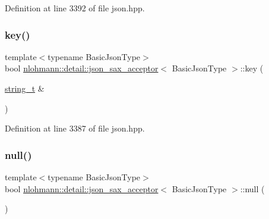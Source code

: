 Definition at line 3392 of file json.\+hpp.

\mbox{\label{classnlohmann_1_1detail_1_1json__sax__acceptor_a59e1ea5e9c8d25346a564bf9287a5c2a}} 
\subsubsection{\texorpdfstring{key()}{key()}}
{\footnotesize\ttfamily template$<$typename Basic\+Json\+Type$>$ \\
bool \mbox{\hyperlink{classnlohmann_1_1detail_1_1json__sax__acceptor}{nlohmann\+::detail\+::json\+\_\+sax\+\_\+acceptor}}$<$ Basic\+Json\+Type $>$\+::key (\begin{DoxyParamCaption}\item[{\mbox{\hyperlink{classnlohmann_1_1detail_1_1json__sax__acceptor_a3a8078bbf865ec355106f6048241609a}{string\+\_\+t}} \&}]{ }\end{DoxyParamCaption})\hspace{0.3cm}{\ttfamily [inline]}}



Definition at line 3387 of file json.\+hpp.

\mbox{\label{classnlohmann_1_1detail_1_1json__sax__acceptor_ad7ad55168af6e03ed8b844c94a17b9ce}} 
\subsubsection{\texorpdfstring{null()}{null()}}
{\footnotesize\ttfamily template$<$typename Basic\+Json\+Type$>$ \\
bool \mbox{\hyperlink{classnlohmann_1_1detail_1_1json__sax__acceptor}{nlohmann\+::detail\+::json\+\_\+sax\+\_\+acceptor}}$<$ Basic\+Json\+Type $>$\+::null (\begin{DoxyParamCaption}{ }\end{DoxyParamCaption})\hspace{0.3cm}{\ttfamily [inline]}}




